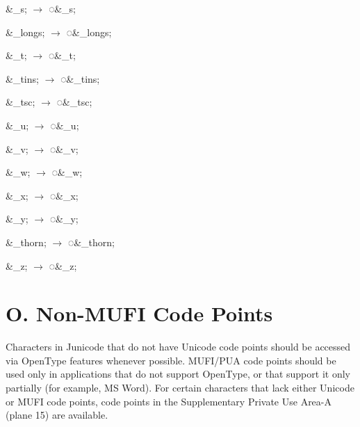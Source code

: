 \documentclass[letterpaper,12pt]{article}
\newcommand\textstyleEntityRef[1]{\textrm{#1}}
\begin{document}
\begin{multicols}{3}
\textcolor[rgb]{0.20392157,0.39607844,0.6431373}{\&\_{\textcompwordmark}s; $\rightarrow $
}\textstyleEntityRef{\textcolor[rgb]{0.20392157,0.39607844,0.6431373}{◌\&\_s;}}

\textcolor[rgb]{0.20392157,0.39607844,0.6431373}{\narrow\&\_{\textcompwordmark}longs; $\rightarrow $
}\textstyleEntityRef{\textcolor[rgb]{0.20392157,0.39607844,0.6431373}{◌\&\_longs;}}

\textstyleEntityRef{\textcolor[rgb]{0.20392157,0.39607844,0.6431373}{\&\_{\textcompwordmark}t; $\rightarrow $
◌\&\_t;}}

\textcolor[rgb]{0.20392157,0.39607844,0.6431373}{\&\_{\textcompwordmark}tins; $\rightarrow $
}\textstyleEntityRef{\textcolor[rgb]{0.20392157,0.39607844,0.6431373}{◌\&\_tins;}}

\textcolor[rgb]{0.20392157,0.39607844,0.6431373}{\&\_{\textcompwordmark}tsc; $\rightarrow $
}\textstyleEntityRef{\textcolor[rgb]{0.20392157,0.39607844,0.6431373}{◌\&\_tsc;}}

\textcolor[rgb]{0.20392157,0.39607844,0.6431373}{\&\_{\textcompwordmark}u; $\rightarrow $
}\textstyleEntityRef{\textcolor[rgb]{0.20392157,0.39607844,0.6431373}{◌\&\_u;}}

\textstyleEntityRef{\textcolor[rgb]{0.20392157,0.39607844,0.6431373}{\&\_{\textcompwordmark}v; $\rightarrow $
◌\&\_v;}}

\textcolor[rgb]{0.20392157,0.39607844,0.6431373}{\&\_{\textcompwordmark}w; $\rightarrow $
}\textstyleEntityRef{\textcolor[rgb]{0.20392157,0.39607844,0.6431373}{◌\&\_w;}}

\textstyleEntityRef{\textcolor[rgb]{0.20392157,0.39607844,0.6431373}{\&\_{\textcompwordmark}x; $\rightarrow $
◌\&\_x;}}

\textcolor[rgb]{0.20392157,0.39607844,0.6431373}{\&\_{\textcompwordmark}y; $\rightarrow $
}\textstyleEntityRef{\textcolor[rgb]{0.20392157,0.39607844,0.6431373}{◌\&\_y;}}

\textcolor[rgb]{0.20392157,0.39607844,0.6431373}{\narrow\&\_{\textcompwordmark}thorn; $\rightarrow $
}\textstyleEntityRef{\textcolor[rgb]{0.20392157,0.39607844,0.6431373}{◌\&\_thorn;}}

\textcolor[rgb]{0.20392157,0.39607844,0.6431373}{\&\_{\textcompwordmark}z; $\rightarrow $
}\textstyleEntityRef{\textcolor[rgb]{0.20392157,0.39607844,0.6431373}{◌\&\_z;}}
\end{multicols}
\section{O. Non-MUFI Code Points}
\hypertarget{nonmufi}{}Characters in Junicode that do not have Unicode code points should be accessed via OpenType
features whenever possible. MUFI/PUA code points should be used only in applications that do not support OpenType, or
that support it only partially (for example, MS Word). For certain characters that lack either Unicode or MUFI code
points, code points in the Supplementary Private Use Area-A (plane 15) are available.
\end{document}

